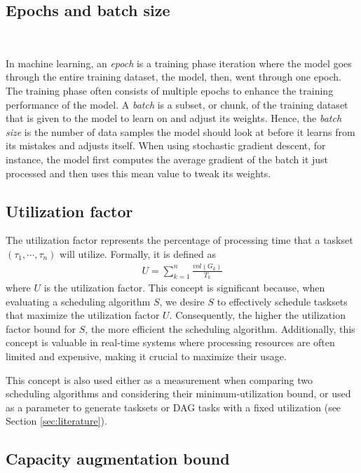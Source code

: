 \subsection{Epochs and batch size}
~

In machine learning,
an \textit{epoch} is a training phase iteration where 
the model goes through the entire training dataset, 
the model, then, went through one epoch.
The training phase often consists of multiple epochs to 
enhance the training performance of the model.
A \textit{batch} is a subset, or chunk,  of the training dataset
that is given to the model to learn on and adjust its weights.
Hence, the \textit{batch size} is the number of data samples
the model should look at before it learns from its mistakes
and adjusts itself.
When using stochastic gradient descent, for instance,
the model first computes the average gradient of the batch
it just processed and then uses this mean value to 
tweak its weights.

\subsection{Utilization factor}

The utilization factor represents the percentage of processing 
time that a taskset $(\tau_1, \cdots, \tau_n)$ will utilize. 
Formally, it is defined as
\begin{align}
U = \sum_{k=1}^{n} \frac{vol(G_k)}{T_k}
\end{align}
where $U$ is the utilization factor. This concept is significant 
because, when evaluating a scheduling algorithm $S$, we desire 
$S$ to effectively schedule tasksets that maximize the utilization 
factor $U$. Consequently, the higher the utilization factor bound 
for $S$, the more efficient the scheduling algorithm. Additionally, 
this concept is valuable in real-time systems where processing 
resources are often limited and expensive, making it crucial to 
maximize their usage.

This concept is also used either as a measurement
when comparing two scheduling algorithms 
and considering their minimum-utilization bound,
or used as a parameter to generate tasksets or DAG tasks with 
a fixed utilization (see Section \ref{sec:literature}).


\subsection{Capacity augmentation bound}

